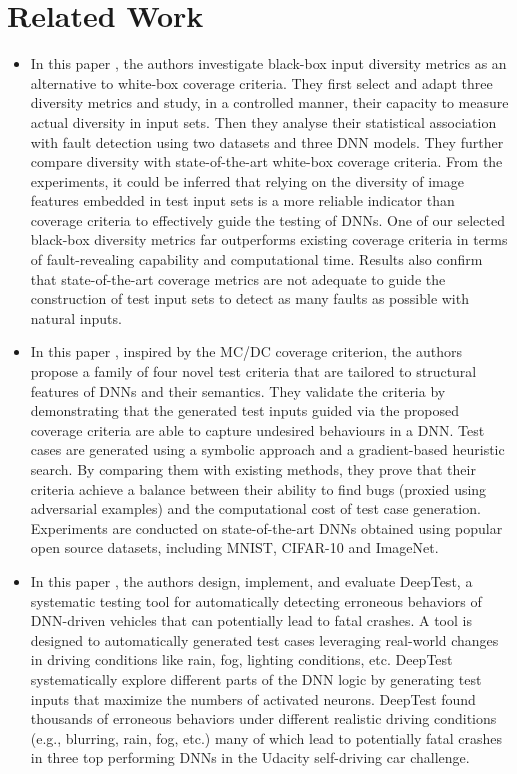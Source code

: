 \documentclass[rnd]{mas_proposal}
\begin{document}
\section{Related Work}
\begin{itemize}
    \item In this paper \cite{DBLP:journals/corr/abs-2112-12591}, the authors investigate black-box input diversity metrics as an alternative to white-box coverage criteria. They first select and adapt three diversity metrics and study, in a controlled manner, their capacity to measure actual diversity in input sets. Then they analyse their statistical association with fault detection using two datasets and three DNN models. They further compare diversity with state-of-the-art white-box coverage criteria. From the experiments, it could be inferred that relying on the diversity of image features embedded in test input sets is a more reliable indicator than coverage criteria to effectively guide the testing of DNNs. One of our selected black-box diversity metrics far outperforms existing coverage criteria in terms of fault-revealing capability and computational time. Results also confirm that state-of-the-art coverage metrics are not adequate to guide the construction of test input sets to detect as many faults as possible with natural inputs.
    
    \item In this paper \cite{DBLP:journals/corr/abs-1803-04792} , inspired by the MC/DC coverage criterion, the authors propose a family of four novel test criteria that are tailored to structural features of DNNs and their semantics. They validate the criteria by demonstrating that the generated test inputs guided via the proposed coverage criteria are able to capture undesired behaviours in a DNN. Test cases are generated using a symbolic approach and a gradient-based heuristic search. By comparing them with existing methods, they prove that their criteria achieve a balance between their ability to find bugs (proxied using adversarial examples) and the computational cost of test case generation. Experiments are conducted on state-of-the-art DNNs obtained using popular open source datasets, including MNIST, CIFAR-10 and ImageNet.
    
    \item In this paper \cite{10.1145/3180155.3180220}, the authors design, implement, and evaluate DeepTest, a systematic testing tool for automatically detecting erroneous behaviors of DNN-driven vehicles that can potentially lead to fatal crashes. A tool is designed to automatically generated test cases leveraging real-world changes in driving conditions like rain, fog, lighting conditions, etc. DeepTest systematically explore different parts of the DNN logic by generating test inputs that maximize the numbers of activated neurons. DeepTest found thousands of erroneous behaviors under different realistic driving conditions (e.g., blurring, rain, fog, etc.) many of which lead to potentially fatal crashes in three top performing DNNs in the Udacity self-driving car challenge.
    

\end{itemize}
\end{document}
